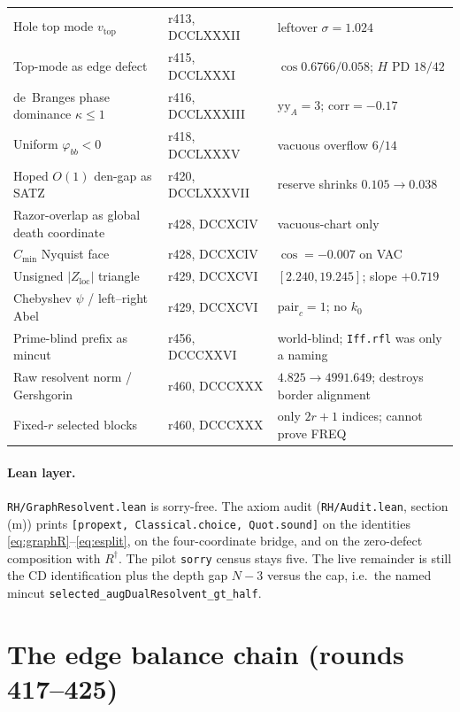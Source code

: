 \documentclass[11pt]{article}
\theoremstyle{remark}
\newcommand{\Rd}{R^{\dagger}}
\newcommand{\Zloc}{Z_{\mathrm{loc}}}
\begin{document}
\begin{table}[ht]
{\begin{tabular}{@{}llp{5.4cm}@{}}
Hole top mode $v_{\mathrm{top}}$
  & r413, DCCLXXXII & leftover $\sigma=1.024$ \\
Top-mode as edge defect
  & r415, DCCLXXXI & $\cos0.6766/0.058$; $H$ PD $18/42$ \\
de~Branges phase dominance $\kappa\le1$
  & r416, DCCLXXXIII & $\mathrm{yy}_{A}=3$; $\mathrm{corr}=-0.17$ \\
Uniform $\varphi_{bb}<0$
  & r418, DCCLXXXV & vacuous overflow $6/14$ \\
Hoped $O(1)$ den-gap as SATZ
  & r420, DCCLXXXVII & reserve shrinks $0.105\to0.038$ \\
Razor-overlap as global death coordinate
  & r428, DCCXCIV & vacuous-chart only \\
$C_{\min}$ Nyquist face
  & r428, DCCXCIV & $\cos=-0.007$ on VAC \\
Unsigned $|\Zloc|$ triangle
  & r429, DCCXCVI & $[2.240,19.245]$; slope $+0.719$ \\
Chebyshev $\psi$ / left--right Abel
  & r429, DCCXCVI & $\mathrm{pair}_{c}=1$; no $k_{0}$ \\
Prime-blind prefix as mincut
  & r456, DCCCXXVI & world-blind; \texttt{Iff.rfl} was only a naming \\
Raw resolvent norm / Gershgorin
  & r460, DCCCXXX & $4.825\to4991.649$; destroys border alignment \\
Fixed-$r$ selected blocks
  & r460, DCCCXXX & only $2r+1$ indices; cannot prove FREQ \\
\bottomrule
\end{tabular}}
\end{table}

\paragraph{Lean layer.}
\texttt{RH/GraphResolvent.lean} is sorry-free.  The axiom audit
(\texttt{RH/Audit.lean}, section (m)) prints
\texttt{[propext, Classical.choice, Quot.sound]} on the identities
\eqref{eq:graphR}--\eqref{eq:esplit}, on the four-coordinate
bridge, and on the zero-defect composition with $\Rd$.
The pilot \texttt{sorry} census stays five.  The live remainder is
still the CD identification plus the depth gap $N-3$ versus the
cap, i.e.\ the named mincut
\texttt{selected\_augDualResolvent\_gt\_half}.

\section{The edge balance chain (rounds 417--425)}\label{sec:edgebal}
\end{document}
